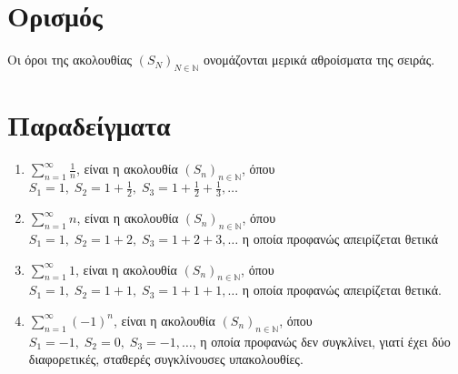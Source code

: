 \documentclass[main.tex]{subfiles}
\begin{document}
\section{Ορισμός}



\begin{rem}
Οι όροι της ακολουθίας $ {(S_{N})}_{N \in \mathbb{N}} $ ονομάζονται 
\textcolor{Col2}{μερικά αθροίσματα} της σειράς.
\end{rem}

\section{Παραδείγματα}

\begin{enumerate}
    \item $ \sum_{n=1}^{\infty} \frac{1}{n} $, είναι η ακολουθία 
        $ {(S_{n})}_{n \in \mathbb{N}} $, όπου $ S_{1}=1, \; S_{2}=1+ \frac{1}{2}, \; 
        S_{3}= 1 + \frac{1}{2} + \frac{1}{3}, \ldots  $

    \item $ \sum_{n=1}^{\infty} n  $, είναι η ακολουθία ${(S_{n})}_{n \in \mathbb{N}}$,
        όπου $ S_{1}=1, \; S_{2}=1+2, \; S_{3}=1+2+3, \ldots $ η οποία προφανώς 
        απειρίζεται θετικά

    \item $ \sum_{n=1}^{\infty} 1  $, είναι η ακολουθία ${(S_{n})}_{n \in \mathbb{N}}$,
        όπου $ S_{1}=1, \; S_{2}=1+1, \; S_{3}=1+1+1, \ldots $ η οποία προφανώς 
        απειρίζεται θετικά.

    \item $ \sum_{n=1}^{\infty} {(-1)}^{n}  $, είναι η ακολουθία 
        $ {(S_{n})}_{n \in \mathbb{N}} $, όπου $ S_{1}=-1, \; S_{2}=0, \; S_{3}=-1, 
        \ldots $, η οποία προφανώς δεν συγκλίνει, γιατί έχει δύο διαφορετικές, σταθερές 
        συγκλίνουσες υπακολουθίες.
\end{enumerate}
\end{document}
